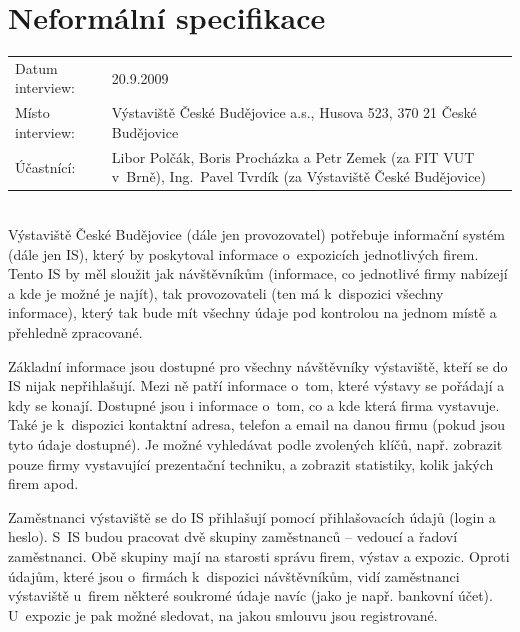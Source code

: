 
\section*{Neformální specifikace}

\begin{tabular}{l p{11cm}}
	Datum interview: & 20.9.2009 \\
	Místo interview: & Výstaviště České Budějovice a.s., Husova 523, 370 21
		České Budějovice \\
	Účastnící: & Libor Polčák, Boris Procházka a Petr Zemek (za FIT VUT v~Brně),
		Ing.~Pavel Tvrdík (za Výstaviště České Budějovice)
\end{tabular} \\

Výstaviště České Budějovice (dále jen provozovatel) potřebuje informační systém
(dále jen IS), který by poskytoval informace o~expozicích jednotlivých firem.
Tento IS by měl sloužit jak návštěvníkům (informace, co jednotlivé firmy
nabízejí a kde je možné je najít), tak provozovateli (ten má k~dispozici
všechny informace), který tak bude mít všechny údaje pod kontrolou na jednom
místě a přehledně zpracované.

Základní informace jsou dostupné pro všechny návštěvníky výstaviště, kteří se
do IS nijak nepřihlašují. Mezi ně patří informace o~tom, které výstavy se
pořádají a kdy se konají. Dostupné jsou i informace o~tom, co a kde která firma
vystavuje. Také je k~dispozici kontaktní adresa, telefon a email na danou firmu
(pokud jsou tyto údaje dostupné). Je možné vyhledávat podle zvolených klíčů,
např. zobrazit pouze firmy vystavující prezentační techniku, a zobrazit
statistiky, kolik jakých firem apod.

Zaměstnanci výstaviště se do IS přihlašují pomocí přihlašovacích údajů (login a
heslo). S~IS budou pracovat dvě skupiny zaměstnanců -- vedoucí a řadoví
zaměstnanci. Obě skupiny mají na starosti správu firem, výstav a expozic.
Oproti údajům, které jsou o~firmách k~dispozici návštěvníkům, vidí zaměstnanci
výstaviště u~firem některé soukromé údaje navíc (jako je např. bankovní účet).
U~expozic je pak možné sledovat, na jakou smlouvu jsou registrované.


